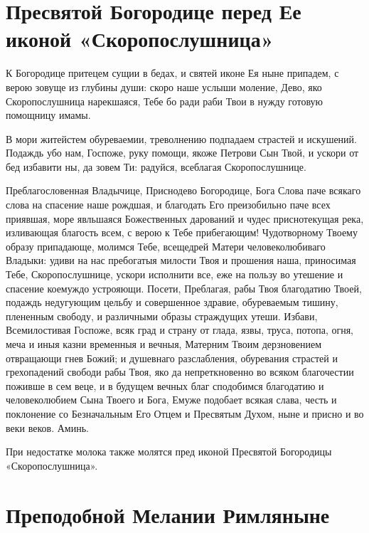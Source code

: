 \section{Пресвятой Богородице перед Ее иконой «Скоропослушница»}
 
К Богородице притецем сущии в бедах, и святей иконе Ея ныне припадем, с верою зовуще из глубины души: скоро наше услыши моление, Дево, яко Скоропослушница нарекшаяся, Тебе бо ради раби Твои в нужду готовую помощницу имамы.




В мори житейстем обуреваемии, треволнению подпадаем страстей и искушений. Подаждь убо нам, Госпоже, руку помощи, якоже Петрови Сын Твой, и ускори от бед избавити ны, да зовем Ти: радуйся, всеблагая Скоропослушнице.




Преблагословенная Владычице, Приснодево Богородице, Бога Слова паче всякаго слова на спасение наше рождшая, и благодать Его преизобильно паче всех приявшая, море явльшаяся Божественных дарований и чудес приснотекущая река, изливающая благость всем, с верою к Тебе прибегающим! Чудотворному Твоему образу припадающе, молимся Тебе, всещедрей Матери человеколюбиваго Владыки: удиви на нас пребогатыя милости Твоя и прошения наша, приносимая Тебе, Скоропослушнице, ускори исполнити все, еже на пользу во утешение и спасение коемуждо устрояющи. Посети, Преблагая, рабы Твоя благодатию Твоей, подаждь недугующим цельбу и совершенное здравие, обуреваемым тишину, плененным свободу, и различными образы страждущих утеши. Избави, Всемилостивая Госпоже, всяк град и страну от глада, язвы, труса, потопа, огня, меча и иныя казни временныя и вечныя, Матерним Твоим дерзновением отвращающи гнев Божий; и душевнаго разслабления, обуревания страстей и грехопадений свободи рабы Твоя, яко да непреткновенно во всяком благочестии поживше в сем веце, и в будущем вечных благ сподобимся благодатию и человеколюбием Сына Твоего и Бога, Емуже подобает всякая слава, честь и поклонение со Безначальным Его Отцем и Пресвятым Духом, ныне и присно и во веки веков. Аминь.

При недостатке молока также молятся пред иконой Пресвятой Богородицы «Скоропослушница».

\section{Преподобной Мелании Римляныне}
 

